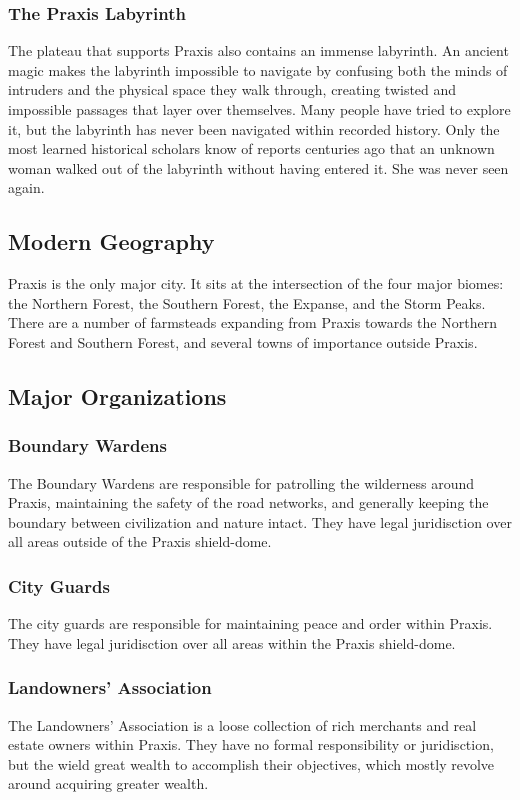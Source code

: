     \subsubsection{The Praxis Labyrinth}
      The plateau that supports Praxis also contains an immense labyrinth.
      An ancient magic makes the labyrinth impossible to navigate by confusing both the minds of intruders and the physical space they walk through, creating twisted and impossible passages that layer over themselves.
      Many people have tried to explore it, but the labyrinth has never been navigated within recorded history.
      Only the most learned historical scholars know of reports centuries ago that an unknown woman walked out of the labyrinth without having entered it.
      She was never seen again.

  \subsection{Modern Geography}
    Praxis is the only major city.
    It sits at the intersection of the four major biomes: the Northern Forest, the Southern Forest, the Expanse, and the Storm Peaks.
    There are a number of farmsteads expanding from Praxis towards the Northern Forest and Southern Forest, and several towns of importance outside Praxis.

  \subsection{Major Organizations}

    \subsubsection{Boundary Wardens}
      The Boundary Wardens are responsible for patrolling the wilderness around Praxis, maintaining the safety of the road networks, and generally keeping the boundary between civilization and nature intact.
      They have legal juridisction over all areas outside of the Praxis shield-dome.

    \subsubsection{City Guards}
      The city guards are responsible for maintaining peace and order within Praxis.
      They have legal juridisction over all areas within the Praxis shield-dome.

    \subsubsection{Landowners' Association}
      The Landowners' Association is a loose collection of rich merchants and real estate owners within Praxis.
      They have no formal responsibility or juridisction, but the wield great wealth to accomplish their objectives, which mostly revolve around acquiring greater wealth.

